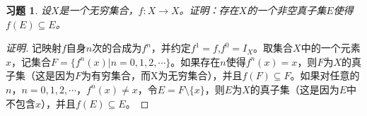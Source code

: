 \documentclass{article}
\begin{document}
\begin{CJK}{UTF8}{gbsn}
\newtheorem*{Ex}{习题}
\begin{Ex}
设$X$是一个无穷集合，$f:X\to X$。证明：存在$X$的一个非空真子集$E$使得$f(E)\subseteq E$。
\end{Ex}
\begin{proof}[证明]
  记映射$f$自身$n$次的合成为$f^n$，并约定$f^1=f$,$f^0=I_X$。取集合$X$中的一个元素$x$，记集合$F=\{f^n(x)|n=0,1,2,\cdots\}$。如果存在$n$使得$f^n(x)=x$，则$F$为$X$的真子集（这是因为$F$为有穷集合，而X为无穷集合），并且$f(F)\subseteq F$。如果对任意的$n$，$n=0,1,2,\cdots $，$f^n(x)\neq x$，令$E=F\setminus \{x\}$，则$E$为$X$的真子集（这是因为$E$中不包含$x$），并且$f(E)\subseteq E$。
\end{proof}
\end{CJK}
\end{document}
